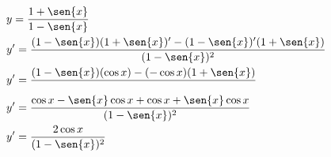 \begin{ex}
\begin{align}
&y=\frac{1+\sen{x}}{1-\sen{x}}\nonumber\\
&y'=\frac{(1-\sen{x})(1+\sen{x})'-(1-\sen{x})'(1+\sen{x})}{(1-\sen{x})^2}\nonumber\\
&y'=\frac{(1-\sen{x})(\cos{x})-(-\cos{x})(1+\sen{x})}\nonumber\\
&y'=\frac{\cos{x}-\sen{x}\cos{x}+\cos{x}+\sen{x}\cos{x}}{(1-\sen{x})^2}\nonumber\\
&y'=\frac{2\cos{x}}{(1-\sen{x})^2}\nonumber
\end{align}
\end{ex}
